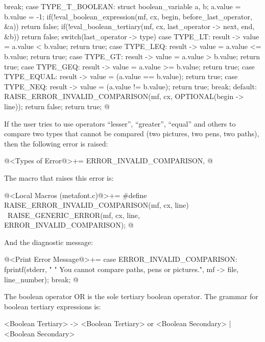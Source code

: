 {{{{{{{{{{      }          
      break;
    }
    case TYPE_T_BOOLEAN:
    {
      struct boolean_variable a, b;
      a.value = b.value = -1;
      if(!eval_boolean_expression(mf, cx, begin, before_last_operator, &a))
        return false;
      if(!eval_boolean_tertiary(mf, cx, last_operator -> next, end, &b))
        return false;
      switch(last_operator -> type){
      case TYPE_LT:
        result -> value = a.value < b.value;
        return true;
      case TYPE_LEQ:
        result -> value = a.value <= b.value;
        return true;
      case TYPE_GT:
        result -> value = a.value > b.value;
        return true;
      case TYPE_GEQ:
        result -> value = a.value >= b.value;
        return true;
      case TYPE_EQUAL:
        result -> value = (a.value == b.value);
        return true;
      case TYPE_NEQ:
        result -> value = (a.value != b.value);
        return true;
      }
      break;
    }
    default:
      RAISE_ERROR_INVALID_COMPARISON(mf, cx, OPTIONAL(begin -> line));
      return false;
    }
    return true;
  }
}
@
\fimcodigo

If the user tries to use operators ``lesser'', ``greater'', ``equal''
and others to compare two types that cannot be compared (two pictures,
two pens, two paths), then the following error is raised:

\iniciocodigo
@<Types of Error@>+=
ERROR_INVALID_COMPARISON,
@
\fimcodigo

The macro that raises this error is:

\iniciocodigo
@<Local Macros (metafont.c)@>+=
#define RAISE_ERROR_INVALID_COMPARISON(mf, cx, line) {\
    RAISE_GENERIC_ERROR(mf, cx, line, ERROR_INVALID_COMPARISON);}
@
\fimcodigo

And the diagnostic message:

\iniciocodigo
@<Print Error Message@>+=
case ERROR_INVALID_COMPARISON:
  fprintf(stderr,
          "%
          " You cannot compare paths, pens or pictures.",
          mf -> file, line_number);
  break;
@
\fimcodigo




The boolean operator OR is the sole tertiary boolean operator. The
grammar for boolean tertiary expressions is:

\alinhaverbatim
<Boolean Tertiary> -> <Boolean Tertiary> or <Boolean Secondary> |
                      <Boolean Secondary>
\alinhanormal

}}}}}
